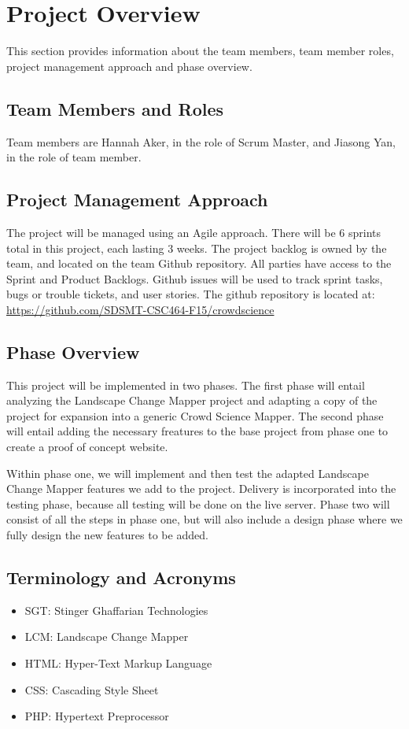 

\chapter{Project Overview}
This section provides information about the team members, team member roles, project management approach and phase overview.



\section{Team Members and Roles}
Team members are Hannah Aker, in the role of Scrum Master, and Jiasong Yan, in the role of team member.


\section{Project  Management Approach}
The project will be managed using an Agile approach.  There will be 6 sprints total in this project, each lasting 3 weeks. The project backlog is owned by the team, and located on the team Github repository. All parties have access to the Sprint and Product Backlogs. Github issues will be used to track sprint tasks, bugs or trouble tickets, and user stories. The github repository is located at: \url{https://github.com/SDSMT-CSC464-F15/crowdscience} 

\section{Phase  Overview}
This project will be implemented in two phases. The first phase will entail analyzing the Landscape Change Mapper project and adapting a copy of the project for expansion into a generic Crowd Science Mapper. The  second phase will entail adding the necessary freatures to the base project from phase one to create a proof of concept website.

Within phase one, we will implement and then test the adapted Landscape Change Mapper features we add to the project. Delivery is incorporated into the testing phase, because all testing will be done on the live server. Phase two will consist of all the steps in phase one, but will also include a design phase where we fully design the new features to be added.

\section{Terminology and Acronyms}
\begin{itemize}
\item SGT: Stinger Ghaffarian Technologies
\item LCM: Landscape Change Mapper
\item HTML: Hyper-Text Markup Language
\item CSS: Cascading Style Sheet
\item PHP: Hypertext Preprocessor
\end{itemize}